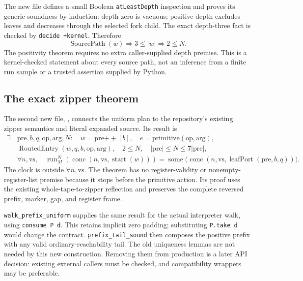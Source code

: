\documentclass[11pt,letterpaper]{article}
\newcommand{\code}[1]{\texttt{\small #1}}
\begin{document}
The new file defines a small Boolean \code{atLeastDepth} inspection and proves its
generic soundness by induction: depth zero is vacuous; positive depth excludes leaves
and decreases through the selected fork child. The exact depth-three fact is checked
by \code{decide +kernel}. Therefore
\[
 \operatorname{SourcePath}(w)\Longrightarrow 3\le |w|
 \Longrightarrow 2\le N.
\]
The positivity theorem requires no extra caller-supplied depth premise. This is a
kernel-checked statement about every source path, not an inference from a finite run
sample or a trusted assertion supplied by Python.

\subsection{The exact zipper theorem}

The second new file, , connects the uniform plan to
the repository's existing zipper semantics and literal expanded source. Its result is
\begin{align*}
 \exists\,&\mathrm{pre},b,q,\mathrm{op},\mathrm{arg},N:\quad
 w=\mathrm{pre}\mathbin{+\!+}[b],\quad
 e=\mathrm{primitive}(\mathrm{op},\mathrm{arg}),\\
 &\operatorname{RoutedEntry}(w,q,b,\mathrm{op},\mathrm{arg}),\quad
 2\le N,\quad |\mathrm{pre}|\le N\le7|\mathrm{pre}|,\\
 &\forall n,\mathrm{vs},\quad
 \operatorname{run}_M^N(\operatorname{conc}(n,\mathrm{vs},\operatorname{start}(w)))
 =\operatorname{some}\bigl(\operatorname{conc}(n,\mathrm{vs},
              \operatorname{leafPort}(\mathrm{pre},b,q))\bigr).
\end{align*}
The clock is outside \(\forall n,\mathrm{vs}\). The theorem has no register-validity
or nonempty-register-list premise because it stops before the primitive action.
Its proof uses the existing whole-tape-to-zipper reflection and preserves the complete
reversed prefix, marker, gap, and register frame.

\code{walk\_prefix\_uniform} supplies the same result for the actual interpreter walk,
using \code{consume P d}. This retains implicit zero padding; substituting
\code{P.take d} would change the contract. \code{prefix\_tail\_sound} then composes
the positive prefix with any valid ordinary-reachability tail. The old uniqueness
lemmas are not needed by this new construction. Removing them from production is a
later API decision: existing external callers must be checked, and compatibility
wrappers may be preferable.
\end{document}
